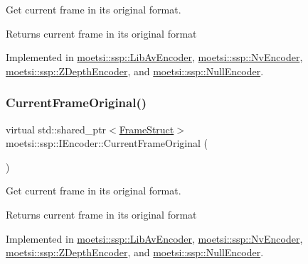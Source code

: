 Get current frame in its original format. 

\begin{DoxyReturn}{Returns}
current frame in its original format 
\end{DoxyReturn}


Implemented in \hyperlink{classmoetsi_1_1ssp_1_1LibAvEncoder_a249c65ad557f438d6856e875f01a1947}{moetsi\+::ssp\+::\+Lib\+Av\+Encoder}, \hyperlink{classmoetsi_1_1ssp_1_1NvEncoder_a56baf331eae448da89ee54b69fec170c}{moetsi\+::ssp\+::\+Nv\+Encoder}, \hyperlink{classmoetsi_1_1ssp_1_1ZDepthEncoder_abe5820ee0dea5fec22e398a7ba4d6777}{moetsi\+::ssp\+::\+Z\+Depth\+Encoder}, and \hyperlink{classmoetsi_1_1ssp_1_1NullEncoder_ad972dfdb93d2f609cdc885c53079ede2}{moetsi\+::ssp\+::\+Null\+Encoder}.

\mbox{\label{classmoetsi_1_1ssp_1_1IEncoder_ab60bdaae0a85289dfa31a12bab533dc0}} 
\subsubsection{\texorpdfstring{Current\+Frame\+Original()}{CurrentFrameOriginal()}\hspace{0.1cm}{\footnotesize\ttfamily [2/2]}}
{\footnotesize\ttfamily virtual std\+::shared\+\_\+ptr$<$\hyperlink{structmoetsi_1_1ssp_1_1FrameStruct}{Frame\+Struct}$>$ moetsi\+::ssp\+::\+I\+Encoder\+::\+Current\+Frame\+Original (\begin{DoxyParamCaption}{ }\end{DoxyParamCaption})\hspace{0.3cm}{\ttfamily [pure virtual]}}



Get current frame in its original format. 

\begin{DoxyReturn}{Returns}
current frame in its original format 
\end{DoxyReturn}


Implemented in \hyperlink{classmoetsi_1_1ssp_1_1LibAvEncoder_a249c65ad557f438d6856e875f01a1947}{moetsi\+::ssp\+::\+Lib\+Av\+Encoder}, \hyperlink{classmoetsi_1_1ssp_1_1NvEncoder_a56baf331eae448da89ee54b69fec170c}{moetsi\+::ssp\+::\+Nv\+Encoder}, \hyperlink{classmoetsi_1_1ssp_1_1ZDepthEncoder_abe5820ee0dea5fec22e398a7ba4d6777}{moetsi\+::ssp\+::\+Z\+Depth\+Encoder}, and \hyperlink{classmoetsi_1_1ssp_1_1NullEncoder_ad972dfdb93d2f609cdc885c53079ede2}{moetsi\+::ssp\+::\+Null\+Encoder}.

